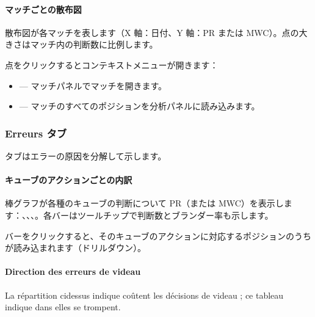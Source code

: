 \documentclass[letterpaper,10pt,dvipdfmx]{sphinxmanual}
\begin{document}
\paragraph{マッチごとの散布図}
\label{\detokenize{manuel:scatter-plot-par-match}}
\sphinxAtStartPar
散布図が各マッチを表します（X 軸：日付、Y 軸：PR または MWC）。点の大きさはマッチ内の判断数に比例します。

\sphinxAtStartPar
点をクリックするとコンテキストメニューが開きます：
\begin{itemize}
\item {} 
\sphinxAtStartPar
{} — マッチパネルでマッチを開きます。

\item {} 
\sphinxAtStartPar
{} — マッチのすべてのポジションを分析パネルに読み込みます。

\end{itemize}


\subsubsection{Erreurs タブ}
\label{\detokenize{manuel:onglet-erreurs}}
\sphinxAtStartPar
{} タブはエラーの原因を分解して示します。


\paragraph{キューブのアクションごとの内訳}
\label{\detokenize{manuel:repartition-par-action-de-videau}}
\sphinxAtStartPar
棒グラフが各種のキューブの判断について PR（または MWC）を表示します：、、、。各バーはツールチップで判断数とブランダー率も示します。

\sphinxAtStartPar
バーをクリックすると、そのキューブのアクションに対応するポジションのうち  が読み込まれます（ドリルダウン）。


\paragraph{Direction des erreurs de videau}
\label{\detokenize{manuel:direction-des-erreurs-de-videau}}
\sphinxAtStartPar
La répartition ci\sphinxhyphen{}dessus indique  coûtent les décisions de videau ;
ce tableau indique dans  elles se trompent.
\end{document}
